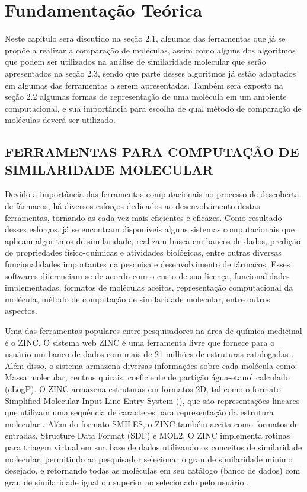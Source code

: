 
\chapter{Fundamentação Teórica}
\label{chap:fundam}
Neste capítulo será discutido na seção 2.1, algumas das ferramentas que já se propõe a realizar
a comparação de moléculas, assim como alguns dos algoritmos que podem ser utilizados na 
análise de similaridade molecular que serão apresentados na seção 2.3, sendo que parte desses 
algoritmos já estão adaptados em algumas das ferramentas a serem apresentadas.
Também será exposto na seção 2.2 algumas formas de representação de uma molécula em um 
ambiente computacional, e sua importância para escolha de qual método de comparação de 
moléculas deverá ser utilizado.

\section{FERRAMENTAS PARA COMPUTAÇÃO DE SIMILARIDADE MOLECULAR}
\setcounter{equation}{1}
Devido a importância das ferramentas computacionais no processo de descoberta de fármacos, há diversos esforços dedicados ao desenvolvimento destas ferramentas, tornando-as cada vez mais eficientes e eficazes. Como resultado desses esforços, já se encontram disponíveis alguns sistemas computacionais que aplicam algoritmos de similaridade, realizam busca em bancos de dados, predição de propriedades físico-químicas e atividades biológicas, entre outras diversas funcionalidades importantes na pesquisa e desenvolvimento de fármacos. Esses softwares diferenciam-se de acordo com o custo de sua licença, funcionalidades implementadas, formatos de moléculas aceitos, representação computacional da molécula, método de computação de similaridade molecular, entre outros aspectos.

Uma das ferramentas populares entre pesquisadores na área de química medicinal é o ZINC. O sistema web ZINC é uma ferramenta livre que fornece para o usuário um banco de dados com mais de 21 milhões de estruturas catalogadas \cite{irwin2005zinc}. Além disso, o sistema armazena diversas informações  sobre cada molécula como: Massa molecular, centros quirais, coeficiente de partição água-etanol calculado (cLogP). O ZINC armazena estruturas em formatos 2D, tal como o formato Simplified Molecular Input Line Entry System (), que são representações lineares que utilizam uma sequência de caracteres para representação da estrutura molecular \cite{kumar2012}. Além do formato SMILES, o ZINC também aceita como formatos de entradas, Structure Data Format (SDF) e MOL2. O ZINC implementa rotinas para triagem virtual em sua base de dados utilizando os conceitos de similaridade molecular, permitindo ao pesquisador selecionar o grau de similaridade mínimo desejado, e retornando todas as moléculas em seu catálogo (banco de dados) com grau de similaridade igual ou superior ao selecionado pelo usuário \cite{irwin2005zinc}.

